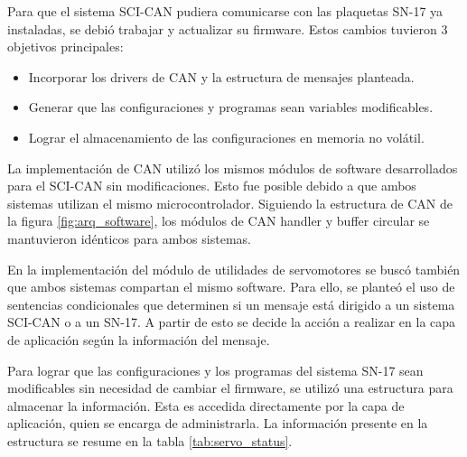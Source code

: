 Para que el sistema SCI-CAN pudiera comunicarse con las plaquetas SN-17 ya instaladas, se debió trabajar y actualizar su firmware. Estos cambios tuvieron 3 objetivos principales:
\begin{itemize}
	\item Incorporar los drivers de CAN y la estructura de mensajes planteada.
	\item Generar que las configuraciones y programas sean variables modificables.
	\item Lograr el almacenamiento de las configuraciones en memoria no volátil.
\end{itemize}

La implementación de CAN utilizó los mismos módulos de software desarrollados para el SCI-CAN sin modificaciones. Esto fue posible debido a que ambos sistemas utilizan el mismo microcontrolador. Siguiendo la estructura de CAN de la figura \ref{fig:arq_software}, los módulos de CAN handler y buffer circular se mantuvieron idénticos para ambos sistemas.

En la implementación del módulo de utilidades de servomotores se buscó también que ambos sistemas compartan el mismo software. Para ello, se planteó el uso de sentencias condicionales que determinen si un mensaje está dirigido a un sistema SCI-CAN o a un SN-17. A partir de esto se decide la acción a realizar en la capa de aplicación según la información del mensaje.

Para lograr que las configuraciones y los programas del sistema SN-17 sean modificables sin necesidad de cambiar el firmware, se utilizó una estructura para almacenar la información. Esta es accedida directamente por la capa de aplicación, quien se encarga de administrarla. La información presente en la estructura se resume en la tabla \ref{tab:servo_status}.

